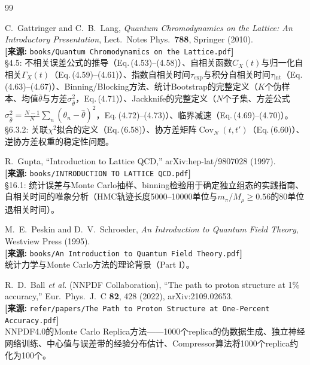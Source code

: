 \documentclass[12pt,a4paper]{ctexart}
\theoremstyle{definition}
\begin{document}
\begin{thebibliography}{99}

C.~Gattringer and C.~B.~Lang,
\textit{Quantum Chromodynamics on the Lattice: An Introductory Presentation},
Lect.\ Notes Phys.\ \textbf{788}, Springer (2010).
\\\textbf{[来源:} \texttt{books/Quantum Chromodynamics on the Lattice.pdf}\textbf{]}
\\§4.5: 不相关误差公式的推导（Eq.\,(4.53)--(4.58)）、自相关函数$C_X(t)$与归一化自相关$\Gamma_X(t)$（Eq.\,(4.59)--(4.61)）、指数自相关时间$\tau_{\text{exp}}$与积分自相关时间$\tau_{\text{int}}$（Eq.\,(4.63)--(4.67)）、Binning/Blocking方法、统计Bootstrap的完整定义（$K$个伪样本、均值$\bar\theta$与方差$\sigma_{\bar\theta}^2$，Eq.\,(4.71)）、Jackknife的完整定义（$N$个子集、方差公式$\sigma^2_{\hat\theta} = \frac{N-1}{N}\sum_n(\theta_n-\hat\theta)^2$，Eq.\,(4.72)--(4.73)）、临界减速（Eq.\,(4.69)--(4.70)）。§6.3.2: 关联$\chi^2$拟合的定义（Eq.\,(6.58)）、协方差矩阵$\operatorname{Cov}_N(t,t')$（Eq.\,(6.60)）、逆协方差权重的稳定性问题。

R.~Gupta,
``Introduction to Lattice QCD,''
arXiv:hep-lat/9807028 (1997).
\\\textbf{[来源:} \texttt{books/INTRODUCTION TO LATTICE QCD.pdf}\textbf{]}
\\§16.1: 统计误差与Monte Carlo抽样、binning检验用于确定独立组态的实践指南、自相关时间的唯象分析（HMC轨迹长度5000--10000单位与$m_\pi/M_\rho \ge 0.56$的80单位退相关时间）。

M.~E.~Peskin and D.~V.~Schroeder,
\textit{An Introduction to Quantum Field Theory},
Westview Press (1995).
\\\textbf{[来源:} \texttt{books/An Introduction to Quantum Field Theory.pdf}\textbf{]}
\\统计力学与Monte Carlo方法的理论背景（Part I）。

R.~D.~Ball \textit{et al.} (NNPDF Collaboration),
``The path to proton structure at 1\% accuracy,''
Eur.\ Phys.\ J.\ C \textbf{82}, 428 (2022), arXiv:2109.02653.
\\\textbf{[来源:} \texttt{refer/papers/The Path to Proton Structure at One-Percent Accuracy.pdf}\textbf{]}
\\NNPDF4.0的Monte Carlo Replica方法——1000个replica的伪数据生成、独立神经网络训练、中心值与误差带的经验分布估计、Compressor算法将1000个replica约化为100个。


\end{thebibliography}
\end{document}
